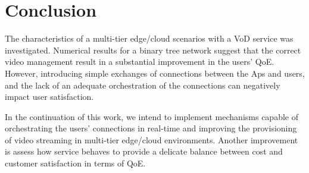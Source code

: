 \section{Conclusion}
\label{sec:conclusion}


The characteristics of a multi-tier edge/cloud scenarios with a VoD service was investigated. Numerical results for a binary tree network suggest that the correct video management result in a substantial improvement in the users' QoE. However, introducing simple exchanges of connections between the Aps and users, and the lack of an adequate orchestration of the connections can negatively impact user satisfaction.

In the continuation of this work, we intend to implement mechanisms capable of orchestrating the users' connections in real-time and improving the provisioning of video streaming in multi-tier edge/cloud environments.
Another improvement is assess how service behaves to provide a delicate balance between cost and customer satisfaction in terms of QoE.


